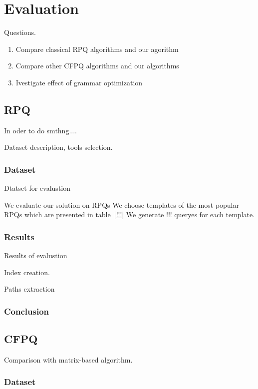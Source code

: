 \section{Evaluation}

Questions.
\begin{enumerate}
	\item Compare classical RPQ algorithms and our agorithm
	\item Compare other CFPQ algorithms and our algorithms
	\item Ivestigate effect of grammar optimization
\end{enumerate}

\subsection{RPQ}

In oder to do smthng....

Dataset description, tools selection.

\subsubsection{Dataset}

Dtatset for evalustion

We evaluate our solution on RPQs 
We choose templates of the most popular RPQs which are presented in table~\ref{!!!}
We generate !!! queryes for each template.

\subsubsection{Results}

Results of evalustion

Index creation.

Paths extraction

\subsubsection{Conclusion}

\subsection{CFPQ}

Comparison with matrix-based algorithm.

\subsubsection{Dataset}

